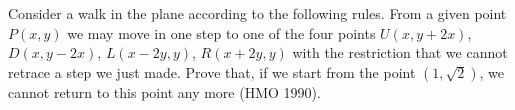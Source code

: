 Consider a walk in the plane according to the following rules. From a given point $P(x, y)$ we may move in one step to one of the four points $U(x, y + 2x)$, $D(x, y - 2x)$, $L(x - 2y, y)$, $R(x + 2y, y)$ with the restriction that we cannot retrace a step we just made. Prove that, if we start from the point $(1, \sqrt{2})$, we cannot return to this point any more (HMO 1990).
